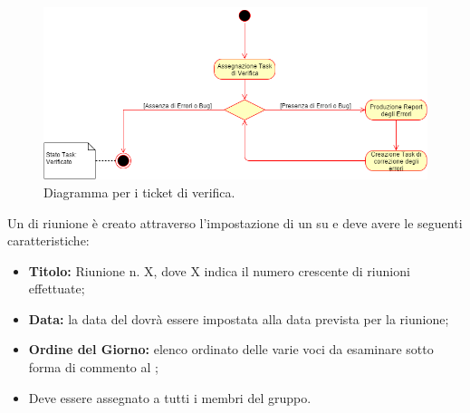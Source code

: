 \documentclass[12pt,a4paper]{article}
\begin{document}
\begin{center}
	\begin{figure}[H]
		\centering
		\label{f1-TicketVerifica}
		\includegraphics[scale=0.6]{TicketVerifica.png}
		\caption{Diagramma per i ticket di verifica.}
	\end{figure}
\end{center}
\label{ticketRiunione}
Un  di riunione è creato attraverso l'impostazione di un  su \textit{} e deve avere le seguenti caratteristiche:
 \begin{itemize}
 	\item \textbf{Titolo:} Riunione n. X, dove X indica il numero crescente di riunioni effettuate;
 	\item \textbf{Data:} la data del  dovrà essere impostata alla data prevista per la riunione;
 	\item \textbf{Ordine del Giorno:} elenco ordinato delle varie voci da esaminare sotto forma di commento al \textit{};
 	\item Deve essere assegnato a tutti i membri del gruppo.
 \end{itemize}
\newpage
\printglossary[title={Glossario}]
\end{document}
